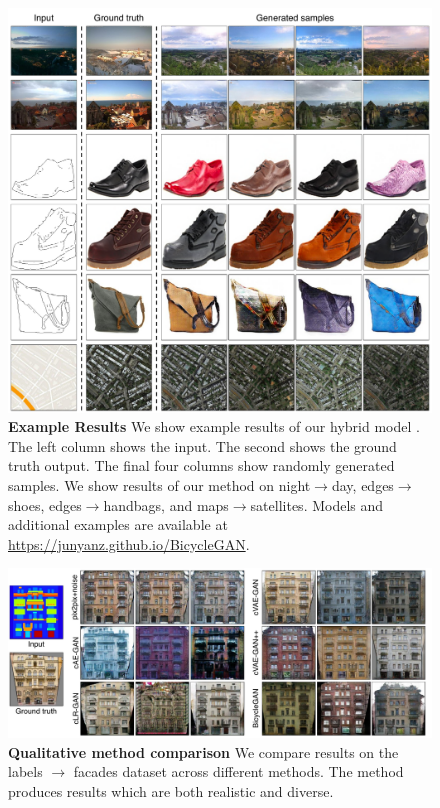 \begin{figure}
\centering
\includegraphics[width=1.\linewidth]{imgs/results_matrix.pdf}
\caption{\small \textbf{Example Results} We show example results of our hybrid model \bicycle. The left column shows the input. The second shows the ground truth output. The final four columns show randomly generated samples. We show results of our method on night$\rightarrow$day, edges$\rightarrow$shoes, edges$\rightarrow$handbags, and maps$\rightarrow$satellites. Models and additional examples are available at \url{https://junyanz.github.io/BicycleGAN}.} 
\vspace{-2mm}
\label{fig:results}
\end{figure}

\begin{figure}
\centering
\hspace{\linewidth}
\includegraphics[width=\linewidth]{imgs/facades_comparison.pdf}
\caption{\small \textbf{Qualitative method comparison} We compare results on the labels $\rightarrow$ facades dataset across different methods. The \bicycle method produces results which are both realistic and diverse.}
\label{fig:resultsFacades}
\end{figure}


